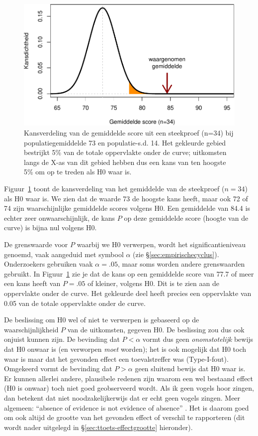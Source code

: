 \documentclass[
]{book}
\begin{document}
\begin{figure}
\centering
\includegraphics{KMS-NL_files/figure-latex/gramm2013onesample-1.pdf}
\caption{\label{fig:gramm2013onesample}Kansverdeling van de gemiddelde score uit een steekproef (n=34) bij populatiegemiddelde 73 en populatie-s.d. 14. Het gekleurde gebied bestrijkt 5\% van de totale oppervlakte onder de curve; uitkomsten langs de X-as van dit gebied hebben dus een kans van ten hoogste 5\% om op te treden als H0 waar is.}
\end{figure}

Figuur~\ref{fig:gramm2013onesample} toont de kansverdeling van het
gemiddelde van de steekproef (\(n=34\)) als H0 waar is. We zien dat de
waarde 73 de hoogste kans heeft, maar ook 72 of 74 zijn waarschijnlijke
gemiddelde scores volgens H0. Een gemiddelde van 84.4 is echter zeer
onwaarschijnlijk, de kans \(P\) op deze gemiddelde score (hoogte van de
curve) is bijna nul volgens H0.

De grenswaarde voor \(P\) waarbij we H0 verwerpen, wordt het
significantieniveau genoemd, vaak aangeduid met symbool \(\alpha\) (zie
§\ref{sec:empirischecyclus}). Onderzoekers gebruiken vaak
\(\alpha=.05\), maar soms worden andere grenswaarden gebruikt. In
Figuur~\ref{fig:gramm2013onesample} zie je dat de kans op een gemiddelde
score van 77.7 of meer een kans heeft van \(P=.05\) of kleiner, volgens
H0. Dit is te zien aan de oppervlakte onder de curve. Het gekleurde deel
heeft precies een oppervlakte van 0.05 van de totale oppervlakte onder
de curve.

De beslissing om H0 wel of niet te verwerpen is gebaseerd op de
waarschijnlijkheid \(P\) van de uitkomsten, gegeven H0. De beslissing zou
dus ook onjuist kunnen zijn. De bevinding dat \(P < \alpha\) vormt dus
geen \emph{onomstotelijk} bewijs dat H0 onwaar is (en verworpen \emph{moet}
worden); het is ook mogelijk dat H0 toch waar is maar dat het gevonden
effect een toevalstreffer was (Type-I-fout). Omgekeerd vormt de
bevinding dat \(P > \alpha\) geen sluitend bewijs dat H0 waar is. Er
kunnen allerlei andere, plausibele redenen zijn waarom een wel bestaand
effect (H0 is onwaar) toch niet goed geobserveerd wordt. Als ik geen
vogels hoor zingen, dan betekent dat niet noodzakelijkerwijs dat er echt
geen vogels zingen. Meer algemeen: ``absence of evidence is not evidence
of absence'' \citetext{\citealp[p.121]{Sagan96}; \citealp{Alde04}}. Het is daarom goed om ook altijd de grootte van het
gevonden effect of verschil te rapporteren (dit wordt nader uitgelegd in
§\ref{sec:ttoets-effectgrootte} hieronder).
\end{document}
